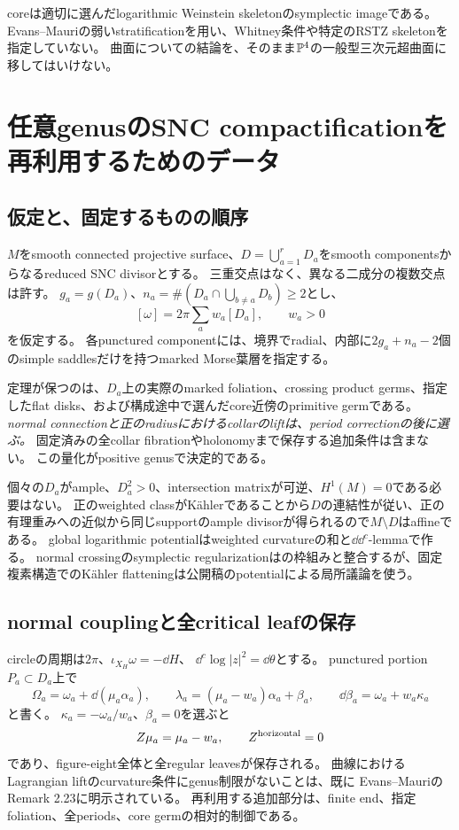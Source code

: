 \documentclass[11pt,a4paper]{article}
\begin{document}
coreは適切に選んだlogarithmic Weinstein skeletonのsymplectic imageである。
Evans--Mauriの弱いstratificationを用い、Whitney条件や特定のRSTZ skeletonを指定していない\cite{EM,RSTZ,Zhou}。
曲面についての結論を、そのまま$\mathbb P^4$の一般型三次元超曲面に移してはいけない。

\section{任意genusのSNC compactificationを再利用するためのデータ}

\subsection{仮定と、固定するものの順序}

$M$をsmooth connected projective surface、$D=\bigcup_{a=1}^rD_a$をsmooth componentsからなるreduced SNC divisorとする。
三重交点はなく、異なる二成分の複数交点は許す。
$g_a=g(D_a)$、$n_a=\#(D_a\cap\bigcup_{b\ne a}D_b)\ge2$とし、
\[
 [\omega]=2\pi\sum_aw_a[D_a],\qquad w_a>0
\]
を仮定する。
各punctured componentには、境界でradial、内部に$2g_a+n_a-2$個のsimple saddlesだけを持つmarked Morse葉層を指定する。

定理が保つのは、$D_a$上の実際のmarked foliation、crossing product germs、指定したflat disks、および構成途中で選んだcore近傍のprimitive germである。
\emph{normal connectionと正のradiusにおけるcollarのliftは、period correctionの後に選ぶ。}
固定済みの全collar fibrationやholonomyまで保存する追加条件は含まない。
この量化がpositive genusで決定的である。

個々の$D_a$がample、$D_a^2>0$、intersection matrixが可逆、$H^1(M)=0$である必要はない。
正のweighted classがKählerであることから$D$の連結性が従い、正の有理重みへの近似から同じsupportのample divisorが得られるので$M\setminus D$はaffineである。
global logarithmic potentialはweighted curvatureの和と$\dd\dd^c$-lemmaで作る\cite[Lemma (5.11), Remark (5.14)]{DGMS}。
normal crossingのsymplectic regularizationは\cite{TMZ}の枠組みと整合するが、固定複素構造でのKähler flatteningは公開稿のpotentialによる局所議論を使う。

\subsection{normal couplingと全critical leafの保存}

circleの周期は$2\pi$、$\iota_{X_H}\omega=-\dd H$、
$\dd^c\log|z|^2=\dd\theta$とする。
punctured portion $P_a\subset D_a$上で
\[
 \Omega_a=\omega_a+\dd(\mu_a\alpha_a),\qquad
 \lambda_a=(\mu_a-w_a)\alpha_a+\beta_a,\qquad
 \dd\beta_a=\omega_a+w_a\kappa_a
\]
と書く。
$\kappa_a=-\omega_a/w_a$、$\beta_a=0$を選ぶと
\[
 Z\mu_a=\mu_a-w_a,\qquad Z^{\rm horizontal}=0
\]
であり、figure-eight全体と全regular leavesが保存される。
曲線におけるLagrangian liftのcurvature条件にgenus制限がないことは、既に
Evans--MauriのRemark 2.23に明示されている\cite{EM}。
再利用する追加部分は、finite end、指定foliation、全periods、core germの相対的制御である。
\end{document}
